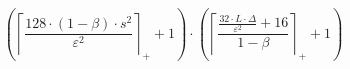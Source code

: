 \[\left(\left\lceil \frac{128 \cdot \left(1 - \beta\right) \cdot s^{2}}{\varepsilon^{2}} \right\rceil_{+} + 1\right) \cdot \left(\left\lceil \frac{\frac{32 \cdot L \cdot \Delta}{\varepsilon^{2}} + 16}{1 - \beta} \right\rceil_{+} + 1\right)\]
